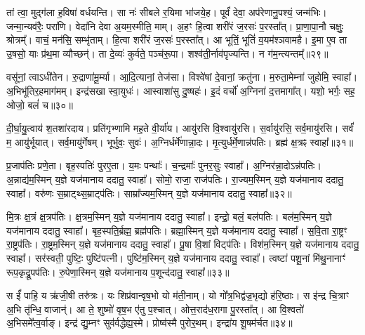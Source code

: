 तां त्वा॒ मुद्ग॑ला ह॒विषा॑ वर्धयन्ति।
सा नः॑ सीबले र॒यिमा भा॑जये॒ह।
पूर्वं॑ देवा॒ अप॑रेणानु॒पश्यं॒ जन्म॑भिः।
जन्मा॒न्यव॑रैः॒ परा॑णि।
वेदा॑नि देवा अ॒यम॒स्मीति॒ माम्।
अ॒हꣳ हि॒त्वा शरी॑रं ज॒रसः॑ प॒रस्ता᳚त्।
प्रा॒णा॒पा॒नौ चक्षुः॒ श्रोत्रम्᳚।
वाचं॒ मन॑सि॒ सम्भृ॑ताम्।
हि॒त्वा शरी॑रं ज॒रसः॑ प॒रस्ता᳚त्।
आ भूतिं॒ भूतिं॑ व॒यम॑श्ञवामहै।
इ॒मा ए॒व ता उ॒षसो॒ याः प्र॑थ॒मा व्यौच्छन्॑।
ता दे॒व्यः॑ कुर्वते॒ पञ्च॑रू॒पा।
शश्व॑ती॒र्नाव॑पृज्यन्ति।
न ग॑म॒न्त्यन्तम्᳚॥२९॥\ip\anuvakamend[क॒रो॒म्यव॑र्त्यै चिच्छुभ्रे\-ऽश्ञवामहै च॒त्वारि॑ च]

वसू॑नां॒ त्वा\-ऽधी॑तेन।
रु॒द्राणा॑मू॒र्म्या।
आ॒दि॒त्यानां॒ तेज॑सा।
विश्वे॑षां दे॒वानां॒ क्रतु॑ना।
म॒रुता॒मेम्ना॑ जुहोमि॒ स्वाहा᳚।
अ॒भि\-भू॑ति\-र॒हमाग॑मम्।
इन्द्र॑सखा स्वा॒युधः॑।
आस्वाशा॑सु दु॒ष्षहः॑।
इ॒दं वर्चो॑ अ॒ग्निना॑ द॒त्तमागा᳚त्।
यशो॒ भर्गः॒ सह॒ ओजो॒ बलं॑ च॥३०॥\ip

दी॒र्घा॒यु॒त्वाय॑ श॒तशा॑रदाय।
प्रति॑\-गृभ्णामि मह॒ते वी॒र्या॑य।
आयु॑रसि वि॒श्वायु॑रसि।
स॒र्वायु॑रसि॒ सर्व॒मायु॑रसि।
सर्वं॑ म॒ आयु॑र्भूयात्।
सर्व॒मायु॑र्गेषम्।
भूर्भुवः॒ सुवः॑।
अ॒ग्निर्धर्मे॑णान्ना॒दः।
मृ॒त्युर्धर्मे॒णान्न॑पतिः।
ब्रह्म॑ क्ष॒त्रꣴ स्वाहा᳚॥३१॥\ip

प्र॒जा\-प॑तिः प्रणे॒ता।
बृह॒स्पतिः॑ पुरए॒ता।
य॒मः पन्थाः᳚।
च॒न्द्रमाः᳚ पुनर॒सुः स्वाहा᳚।
अ॒ग्निर॑न्ना॒दो\-ऽन्न॑पतिः।
अ॒न्नाद्य॑म॒स्मिन् य॒ज्ञे यज॑मानाय ददातु॒ स्वाहा᳚।
सोमो॒ राजा॒ राज॑पतिः।
रा॒ज्यम॒स्मिन् य॒ज्ञे यज॑मानाय ददातु॒ स्वाहा᳚।
वरु॑णः स॒म्राट्थ्स॒म्राट्प॑तिः।
साम्रा᳚ज्यम॒स्मिन् य॒ज्ञे यज॑मानाय ददातु॒ स्वाहा᳚॥३२॥\ip

मि॒त्रः क्ष॒त्रं क्ष॒त्रप॑तिः।
क्ष॒त्रम॒स्मिन् य॒ज्ञे यज॑मानाय ददातु॒ स्वाहा᳚।
इन्द्रो॒ बलं॒ बल॑पतिः।
बल॑म॒स्मिन् य॒ज्ञे यज॑मानाय ददातु॒ स्वाहा᳚।
बृह॒स्पति॒र्ब्रह्म॒ ब्रह्म॑पतिः।
ब्रह्मा॒स्मिन् य॒ज्ञे यज॑मानाय ददातु॒ स्वाहा᳚।
स॒वि॒ता रा॒ष्ट्रꣳ रा॒ष्ट्रप॑तिः।
रा॒ष्ट्रम॒स्मिन् य॒ज्ञे यज॑मानाय ददातु॒ स्वाहा᳚।
पू॒षा वि॒शां विट्प॑तिः।
विश॑म॒स्मिन् य॒ज्ञे यज॑मानाय ददातु॒ स्वाहा᳚।
सर॑स्वती॒ पुष्टिः॒ पुष्टि॑पत्नी।
पुष्टि॑म॒स्मिन् य॒ज्ञे यज॑मानाय ददातु॒ स्वाहा᳚।
त्वष्टा॑ पशू॒नां मि॑थु॒नानाꣳ॑ रूप॒कृद्रू॒पप॑तिः।
रु॒पेणा॒स्मिन् य॒ज्ञे यज॑मानाय प॒शून्द॑दातु॒ स्वाहा᳚॥३३॥\ip\anuvakamend[च॒ स्वाहा॒ साम्रा᳚ज्यम॒स्मिन् य॒ज्ञे यज॑मानाय ददातु॒ स्वाहा॒ विश॑म॒स्मिन् य॒ज्ञे यज॑मानाय ददातु॒ स्वाहा॑ च॒त्वारि॑ च (अ॒ग्निः सोमो॒ वरु॑णो मि॒त्र इन्द्रो॒ बृह॒स्पतिः॑ सवि॒ता पू॒षा सर॑स्वती॒ त्वष्टा॒ दश॑॥)]

स ईं᳚ पाहि॒ य ऋ॑जी॒षी तरु॑त्रः।
यः शिप्र॑वान्वृष॒भो यो म॑ती॒नाम्।
यो गो᳚त्र॒भिद्व॑ज्र॒भृद्यो ह॑रि॒ष्ठाः।
स इ॑न्द्र चि॒त्राꣳ अ॒भि तृ॑न्धि॒ वाजान्॑।
आ ते॒ शुष्मो॑ वृष॒भ ए॑तु प॒श्चात्।
ओत्त॒राद॑ध॒रागा पु॒रस्ता᳚त्।
आ वि॒श्वतो॑ अ॒भिसमे᳚त्व॒र्वाङ्।
इन्द्र॑ द्यु॒म्नꣳ सुव॑र्वद्धेह्य॒स्मे।
प्रोष्व॑स्मै पुरोर॒थम्।
इन्द्रा॑य शू॒षम॑र्चत॥३४॥\ip

